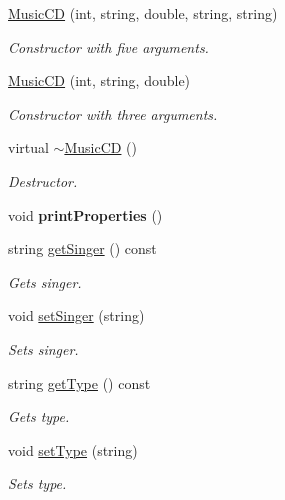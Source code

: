 \begin{DoxyCompactItemize}
\item 
\hyperlink{classMusicCD_a334b0680f6901e6d4f34791aecf075fd}{Music\+CD} (int, string, double, string, string)
\begin{DoxyCompactList}\small\item\em Constructor with five arguments. \end{DoxyCompactList}\item 
\hyperlink{classMusicCD_aecdf5af2b88efcd0f3e0d5722f0316d3}{Music\+CD} (int, string, double)
\begin{DoxyCompactList}\small\item\em Constructor with three arguments. \end{DoxyCompactList}\item 
virtual \hyperlink{classMusicCD_ab484d97087a7eb43716b2f96da6b44d1}{$\sim$\+Music\+CD} ()\hypertarget{classMusicCD_ab484d97087a7eb43716b2f96da6b44d1}{}\label{classMusicCD_ab484d97087a7eb43716b2f96da6b44d1}

\begin{DoxyCompactList}\small\item\em Destructor. \end{DoxyCompactList}\item 
void {\bfseries print\+Properties} ()\hypertarget{classMusicCD_a86f5945b7f17a544ccb286e38058b550}{}\label{classMusicCD_a86f5945b7f17a544ccb286e38058b550}

\item 
string \hyperlink{classMusicCD_a846cbd7718216e12fd65e345abb6e1f4}{get\+Singer} () const 
\begin{DoxyCompactList}\small\item\em Gets singer. \end{DoxyCompactList}\item 
void \hyperlink{classMusicCD_a1a425710dfc010eb5f2bbde63d53f89d}{set\+Singer} (string)
\begin{DoxyCompactList}\small\item\em Sets singer. \end{DoxyCompactList}\item 
string \hyperlink{classMusicCD_ae287ca740f7ad4c70e59ef06f031680a}{get\+Type} () const 
\begin{DoxyCompactList}\small\item\em Gets type. \end{DoxyCompactList}\item 
void \hyperlink{classMusicCD_a1b1ea75abec58c4154dee842f9833995}{set\+Type} (string)
\begin{DoxyCompactList}\small\item\em Sets type. \end{DoxyCompactList}\end{DoxyCompactItemize}


